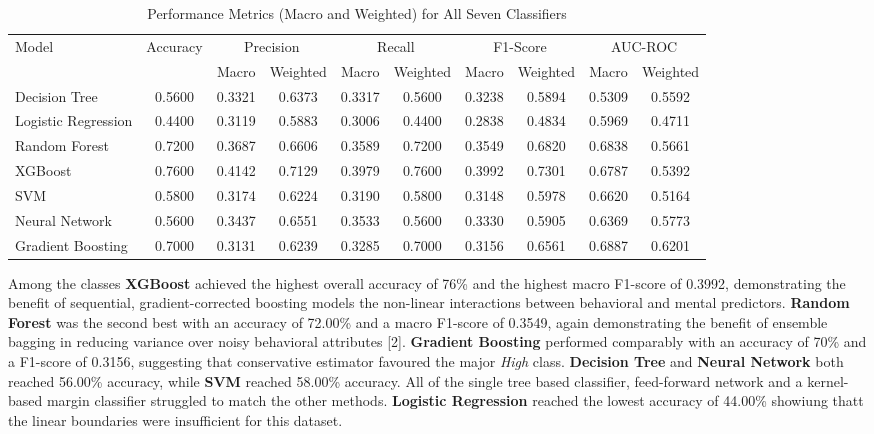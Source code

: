 \documentclass[conference]{IEEEtran}
\begin{document}
\begin{table}[htbp]
\caption{Performance Metrics (Macro and Weighted) for All Seven Classifiers}
\label{tab:performance}
\centering
\footnotesize
\begin{tabular}{|l|c|c|c|c|c|c|c|c|c|}
\hline
\multirow{2}{*}{Model} & \multirow{2}{*}{Accuracy} & \multicolumn{2}{c|}{Precision} & \multicolumn{2}{c|}{Recall} & \multicolumn{2}{c|}{F1-Score} & \multicolumn{2}{c|}{AUC-ROC} \\
\cline{3-10}
 & & Macro & Weighted & Macro & Weighted & Macro & Weighted & Macro & Weighted \\
\hline
Decision Tree       & 0.5600 & 0.3321 & 0.6373 & 0.3317 & 0.5600 & 0.3238 & 0.5894 & 0.5309 & 0.5592 \\
\hline
Logistic Regression & 0.4400 & 0.3119 & 0.5883 & 0.3006 & 0.4400 & 0.2838 & 0.4834 & 0.5969 & 0.4711 \\
\hline
Random Forest        & 0.7200 & 0.3687 & 0.6606 & 0.3589 & 0.7200 & 0.3549 & 0.6820 & 0.6838 & 0.5661 \\
\hline
XGBoost               & 0.7600 & 0.4142 & 0.7129 & 0.3979 & 0.7600 & 0.3992 & 0.7301 & 0.6787 & 0.5392 \\
\hline
SVM                   & 0.5800 & 0.3174 & 0.6224 & 0.3190 & 0.5800 & 0.3148 & 0.5978 & 0.6620 & 0.5164 \\
\hline
Neural Network        & 0.5600 & 0.3437 & 0.6551 & 0.3533 & 0.5600 & 0.3330 & 0.5905 & 0.6369 & 0.5773 \\
\hline
Gradient Boosting     & 0.7000 & 0.3131 & 0.6239 & 0.3285 & 0.7000 & 0.3156 & 0.6561 & 0.6887 & 0.6201 \\
\hline
\end{tabular}
\end{table}

Among the classes \textbf{XGBoost} achieved the highest overall accuracy of 76\% and the highest macro F1-score of 0.3992, demonstrating the benefit of sequential, gradient-corrected boosting models the non-linear interactions between behavioral and mental predictors. \textbf{Random Forest} was the second best with an accuracy of 72.00\% and a macro F1-score of 0.3549, again demonstrating the benefit of ensemble bagging in reducing variance over noisy behavioral attributes [2]. \textbf{Gradient Boosting} performed comparably with an accuracy of 70\% and a F1-score of 0.3156, suggesting that conservative estimator favoured the major \textit{High} class. 
 \textbf{Decision Tree} and \textbf{Neural Network} both reached 56.00\% accuracy, while \textbf{SVM} reached 58.00\% accuracy. All of the single tree based classifier, feed-forward network and a kernel-based margin classifier struggled to match the other methods. \textbf{Logistic Regression} reached the lowest accuracy of 44.00\% showiung thatt the linear boundaries were insufficient for this dataset.
\end{document}
